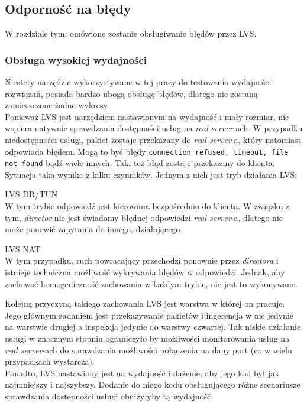 \subsection{Odporność na błędy}
W rozdziale tym, omówione zostanie obsługiwanie błędów przez LVS.
\subsubsection*{Obsługa wysokiej wydajności}
Niestety narzędzie wykorzystywane w tej pracy do testowania wydajności rozwiązań, posiada bardzo ubogą obsługę błędów, dlatego nie zostaną zamieszczone żadne wykresy.\\
Ponieważ LVS jest narzędziem nastawionym na wydajność i mały rozmiar, nie wspiera natywnie sprawdzania dostępności usług na \textit{real server}-ach.
W przypadku niedostępności usługi, pakiet zostaje przekazany do \textit{real server}-a, który natomiast odpowiada błędem.
Mogą to być błędy \texttt{connection refused, timeout, file not found} bądź wiele innych.
Taki też błąd zostaje przekazany do klienta.\\
Sytuacja taka wynika z kilku czynników.
Jednym z nich jest tryb działania LVS:
\begin{description}
	\item{LVS DR/TUN}\\
		W tym trybie odpowiedź jest kierowana bezpośrednio do klienta.
		W związku z tym, \textit{director} nie jest świadomy błędnej odpowiedzi \textit{real server}-a, dlatego nie może ponowić zapytania do innego, działającego.
	\item{LVS NAT}\\
		W tym przypadku, ruch powracający przechodzi ponownie przez \textit{directora} i istnieje techniczna możliwość wykrywania błędów w odpowiedzi.
		Jednak, aby zachować homogeniczność zachowania w każdym trybie, nie jest to wykonywane.
\end{description}
Kolejną przyczyną takiego zachowania LVS jest warstwa w której on pracuje.
Jego głównym zadaniem jest przekazywanie pakietów i ingerencja w nie jedynie na warstwie drugiej a inspekcja jedynie do warstwy czwartej.
Tak niskie działanie usługi w znacznym stopniu ograniczyło by możliwości monitorowania usług na \textit{real server}-ach do sprawdzania możliwości połączenia na dany port (co w wielu przypadkach wystarcza).\\
Ponadto, LVS nastawiony jest na wydajność i dążenie, aby jego kod był jak najmniejszy i najszybszy.
Dodanie do niego kodu obsługującego różne scenariusze sprawdzania dostępności usługi obniżyłyby tą wydajność.

